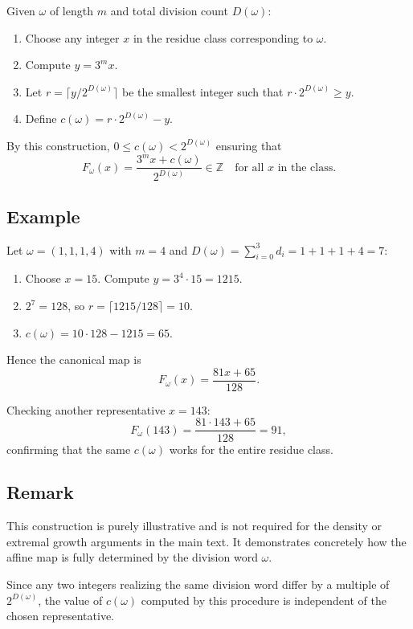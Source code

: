 \documentclass[12pt, oneside]{article}   	%
\numberwithin{equation}{section}          %
\theoremstyle{definition}
\begin{document}
Given \(\omega\) of length \(m\) and total division count \(D(\omega)\):

\begin{enumerate}
\item Choose any integer \(x\) in the residue class corresponding to \(\omega\).  
\item Compute \(y = 3^m x\).  
\item Let \(r = \lceil y / 2^{D(\omega)} \rceil\) be the smallest integer such that \(r \cdot 2^{D(\omega)} \ge y\).  
\item Define \(c(\omega) = r \cdot 2^{D(\omega)} - y\).  
\end{enumerate}

By this construction, \(0 \le c(\omega) < 2^{D(\omega)}\) ensuring that
\[
F_\omega(x) = \frac{3^m x + c(\omega)}{2^{D(\omega)}} \in \mathbb{Z} \quad \text{for all } x \text{ in the class.}
\]

\newpage
\subsection{Example}

Let \(\omega = (1,1,1,4)\) with \(m=4\) and \(D(\omega) = \sum_{i=0}^{3} d_i = 1 + 1 + 1 + 4 = 7\):

\begin{enumerate}
\item Choose \(x = 15\). Compute \(y = 3^4 \cdot 15 = 1215\).  
\item \(2^7 = 128\), so \(r = \lceil 1215/128 \rceil = 10\).  
\item \(c(\omega) = 10 \cdot 128 - 1215 = 65\).  
\end{enumerate}

Hence the canonical map is
\[
F_\omega(x) = \frac{81x + 65}{128}.
\]

Checking another representative \(x = 143\):
\[
F_\omega(143) = \frac{81 \cdot 143 + 65}{128} = 91,
\]
confirming that the same \(c(\omega)\) works for the entire residue class.

\subsection*{Remark}

This construction is purely illustrative and is not required for the density
or extremal growth arguments in the main text. It demonstrates concretely
how the affine map is fully determined by the division word \(\omega\).

Since any two integers realizing the same division word differ by a multiple of $2^{D(\omega)}$,
the value of $c(\omega)$ computed by this procedure is independent of the chosen
representative.
\end{document}
